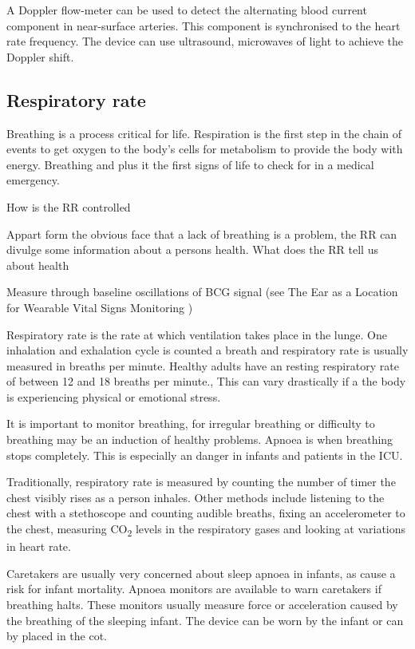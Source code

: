 A Doppler flow-meter can be used to detect the alternating blood current component in near-surface arteries. This component is synchronised to the heart rate frequency. The device can use ultrasound, microwaves of light to achieve the Doppler shift.

\subsection{Respiratory rate}
Breathing is a process critical for life. Respiration is the first step in the chain of events to get oxygen to the body's cells for metabolism to provide the body with energy. Breathing and plus it the first signs of life to check for in a medical emergency. %

How is the RR controlled

Appart form the obvious face that a lack of breathing is a problem, the RR can divulge some information about a persons health. What does the RR tell us about health


Measure through baseline oscillations of BCG signal (see The Ear as a Location for Wearable Vital Signs Monitoring \citep{da2010ear})

Respiratory rate is the rate at which ventilation takes place in the lunge. One inhalation and exhalation cycle is counted a breath and respiratory rate is usually measured in breaths per minute. Healthy adults have an resting respiratory rate of between 12 and 18 breaths per minute., This can vary drastically if a the body is experiencing physical or emotional stress.

It is important to monitor breathing, for irregular breathing or difficulty to breathing may be an induction of healthy problems. Apnoea is when breathing stops completely. This is especially an danger in infants and patients in the ICU.

Traditionally, respiratory rate is measured by counting the number of timer the chest visibly rises as a person inhales. Other methods include listening to the chest with a stethoscope and counting audible breaths, fixing an accelerometer to the chest, measuring CO\textsubscript{2} levels in the respiratory gases and looking at variations in heart rate.

Caretakers are usually very concerned about sleep apnoea in infants, as cause a risk for infant mortality. Apnoea monitors are available to warn caretakers if breathing halts. These monitors usually measure force or acceleration caused by the breathing of the sleeping infant. The device can be worn by the infant or can by placed in the cot.


